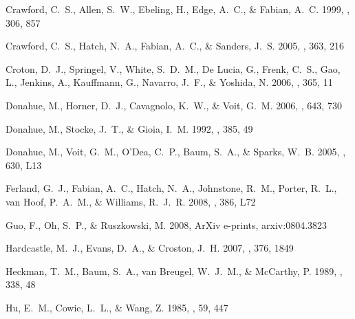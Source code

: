 \documentclass[12pt,preprint]{aastex}
\begin{document}
\begin{thebibliography}{44}
{Crawford}, C.~S., {Allen}, S.~W., {Ebeling}, H., {Edge}, A.~C., \& {Fabian},
  A.~C. 1999, \mnras, 306, 857

{Crawford}, C.~S., {Hatch}, N.~A., {Fabian}, A.~C., \& {Sanders}, J.~S. 2005,
  \mnras, 363, 216

{Croton}, D.~J., {Springel}, V., {White}, S.~D.~M., {De Lucia}, G., {Frenk},
  C.~S., {Gao}, L., {Jenkins}, A., {Kauffmann}, G., {Navarro}, J.~F., \&
  {Yoshida}, N. 2006, \mnras, 365, 11

{Donahue}, M., {Horner}, D.~J., {Cavagnolo}, K.~W., \& {Voit}, G.~M. 2006,
  \apj, 643, 730

{Donahue}, M., {Stocke}, J.~T., \& {Gioia}, I.~M. 1992, \apj, 385, 49

{Donahue}, M., {Voit}, G.~M., {O'Dea}, C.~P., {Baum}, S.~A., \& {Sparks}, W.~B.
  2005, \apjl, 630, L13

{Ferland}, G.~J., {Fabian}, A.~C., {Hatch}, N.~A., {Johnstone}, R.~M.,
  {Porter}, R.~L., {van Hoof}, P.~A.~M., \& {Williams}, R.~J.~R. 2008, \mnras,
  386, L72

{Guo}, F., {Oh}, S.~P., \& {Ruszkowski}, M. 2008, ArXiv e-prints,
  arxiv:0804.3823

{Hardcastle}, M.~J., {Evans}, D.~A., \& {Croston}, J.~H. 2007, \mnras, 376,
  1849

{Heckman}, T.~M., {Baum}, S.~A., {van Breugel}, W.~J.~M., \& {McCarthy}, P.
  1989, \apj, 338, 48

{Hu}, E.~M., {Cowie}, L.~L., \& {Wang}, Z. 1985, \apjs, 59, 447


\end{thebibliography}
\end{document}
